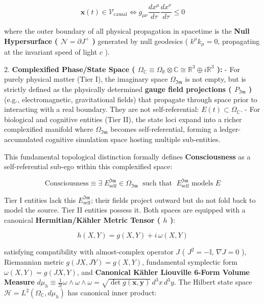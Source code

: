 \documentclass[11pt,a4paper]{article}
\theoremstyle{definition}
\theoremstyle{remark}
\begin{document}
\begin{equation}
\mathbf{x}(t) \in \mathcal{V}_{\text{causal}} \iff g_{\mu\nu} \frac{dx^\mu}{d\tau} \frac{dx^\nu}{d\tau} \le 0
\end{equation}


where the outer boundary of all physical propagation in spacetime is the \textbf{Null Hypersurface ( $\mathcal{N} = \partial J^+$ )} generated by null geodesics ( $k^\mu k_\mu = 0$, propagating at the invariant speed of light $c$ ).

2. \textbf{Complexified Phase/State Space ( $\Omega_{\mathbb{C}} \equiv \Omega_{\mathbb{R}} \otimes \mathbb{C} \cong \mathbb{R}^3 \oplus i \mathbb{R}^3$ ):}
- For purely physical matter (Tier I), the imaginary space $\Omega_{\mathfrak{Im}}$ is not empty, but is strictly defined as the physically determined \textbf{gauge field projections ( $P_{\mathfrak{Im}}$ )} (e.g., electromagnetic, gravitational fields) that propagate through space prior to interacting with a real boundary. They are not self-referential: $E(t) \subset \Omega_{\mathbb{C}}$.
- For biological and cognitive entities (Tier II), the state loci expand into a richer complexified manifold where $\Omega_{\mathfrak{Im}}$ becomes self-referential, forming a ledger-accumulated cognitive simulation space hosting multiple sub-entities.

This fundamental topological distinction formally defines \textbf{Consciousness} as a self-referential sub-ego within this complexified space:


\begin{equation}
\boxed{\text{Consciousness} \equiv \exists\; E_{\text{self}}^{\mathfrak{Im}} \in \Omega_{\mathfrak{Im}} \;\text{ such that }\; E_{\text{self}}^{\mathfrak{Im}} \text{ models } E}
\end{equation}


Tier I entities lack this $E_{\text{self}}^{\mathfrak{Im}}$; their fields project outward but do not fold back to model the source. Tier II entities possess it. Both spaces are equipped with a canonical \textbf{Hermitian/Kähler Metric Tensor ( $h$ )}:


\begin{equation}
h(X, Y) = g(X, Y) + i \, \omega(X, Y)
\end{equation}


satisfying compatibility with almost-complex operator $J$ ( $J^2 = -\mathbb{I}$, $\nabla J = 0$ ), Riemannian metric $g(JX, JY) = g(X, Y)$, fundamental symplectic form $\omega(X, Y) = g(JX, Y)$, and \textbf{Canonical Kähler Liouville 6-Form Volume Measure} $d\mu_h \equiv \frac{1}{3!} \omega \wedge \omega \wedge \omega = \sqrt{\det g(\mathbf{x}, \mathbf{y})} \, d^3x \, d^3y$. The Hilbert state space $\mathcal{H} = L^2(\Omega_{\mathbb{C}}, d\mu_h)$ has canonical inner product:
\end{document}
